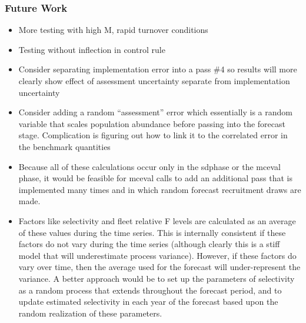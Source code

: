 \subsubsection{Future Work}
\begin{itemize}
	\item More testing with high M, rapid turnover conditions
	\item Testing without inflection in control rule
	\item Consider separating implementation error into a pass \#4 so results will more clearly show effect of assessment uncertainty separate from implementation uncertainty
	\item 	Consider adding a random “assessment” error which essentially is a random variable that scales population abundance before passing into the forecast stage.  Complication is figuring out how to link it to the correlated error in the benchmark quantities
	\item Because all of these calculations occur only in the sdphase or the mceval phase, it would be feasible for mceval calls to add an additional pass that is implemented many times and in which random forecast recruitment draws are made.
	\item Factors like selectivity and fleet relative F levels are calculated as an average of these values during the time series.  This is internally consistent if these factors do not vary during the time series (although clearly this is a stiff model that will underestimate process variance).  However, if these factors do vary over time, then the average used for the forecast will under-represent the variance.  A better approach would be to set up the parameters of selectivity as a random process that extends throughout the forecast period, and to update estimated selectivity in each year of the forecast based upon the random realization of these parameters.
\end{itemize}

	
